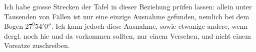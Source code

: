 \expandafter\def\csname HistoricalNoteText21\endcsname{Ich habe grosse Strecken der Tafel in dieser Beziehung prüfen lassen: allein unter Tausenden von
Fällen ist nur eine einzige Ausnahme gefunden, nemlich bei dem Bogen \(27^{0}54'0''\). Ich kann jedoch diese
Ausnahme, sowie etwanige andere, wenn dergl. noch hie und da vorkommen sollten, nur einem Versehen,
und nicht einem Vorsatze zuschreiben.}
